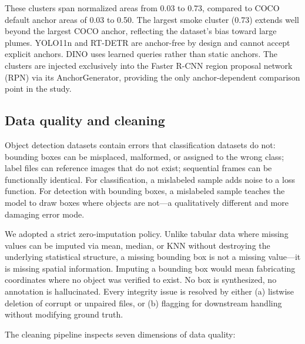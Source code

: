 \documentclass[10pt,twocolumn]{article}
\begin{document}
These clusters span normalized areas from 0.03 to 0.73, compared to COCO default anchor areas of 0.03 to 0.50. The largest smoke cluster (0.73) extends well beyond the largest COCO anchor, reflecting the dataset's bias toward large plumes. YOLO11n and RT-DETR are anchor-free by design and cannot accept explicit anchors. DINO uses learned queries rather than static anchors. The clusters are injected exclusively into the Faster R-CNN region proposal network (RPN) via its AnchorGenerator, providing the only anchor-dependent comparison point in the study.

\subsection{Data quality and cleaning}

Object detection datasets contain errors that classification datasets do not: bounding boxes can be misplaced, malformed, or assigned to the wrong class; label files can reference images that do not exist; sequential frames can be functionally identical. For classification, a mislabeled sample adds noise to a loss function. For detection with bounding boxes, a mislabeled sample teaches the model to draw boxes where objects are not---a qualitatively different and more damaging error mode.

We adopted a strict zero-imputation policy. Unlike tabular data where missing values can be imputed via mean, median, or KNN without destroying the underlying statistical structure, a missing bounding box is not a missing value---it is missing spatial information. Imputing a bounding box would mean fabricating coordinates where no object was verified to exist. No box is synthesized, no annotation is hallucinated. Every integrity issue is resolved by either (a) listwise deletion of corrupt or unpaired files, or (b) flagging for downstream handling without modifying ground truth.

The cleaning pipeline inspects seven dimensions of data quality:
\end{document}
